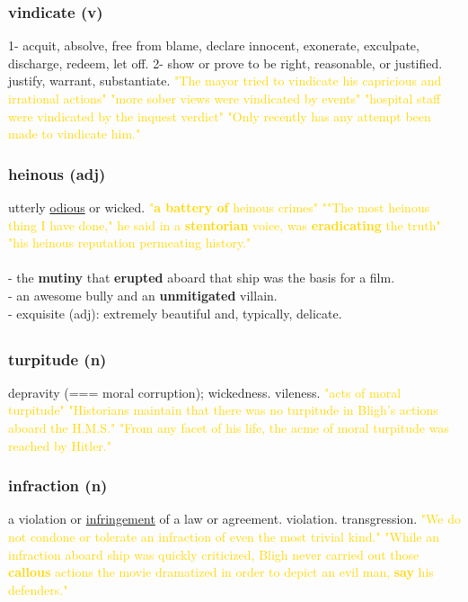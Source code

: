\documentclass{proc}
\begin{document}
	\subsubsection{\textcolor{brickred}{vindicate} (v)}
	1- acquit,
	absolve,
	free from blame,
	declare innocent,
	exonerate,
	exculpate,
	discharge,
	redeem,
	let off.
	2- show or prove to be right, reasonable, or justified.
	justify,
	warrant,
	substantiate.
	\textcolor{gold}{"The mayor tried to vindicate his capricious and irrational actions" "more sober views were vindicated by events" "hospital staff were vindicated by the inquest verdict" "Only recently has any attempt been made to vindicate him."}
	
	\subsubsection{\textcolor{brickred}{heinous} (adj)}
	utterly \underline{odious} or wicked.
	\textcolor{gold}{"\textbf{a battery of} heinous crimes" ""The most heinous thing I have done," he said in a \textbf{stentorian} voice, was \textbf{eradicating} the truth" "his heinous reputation permeating history."}\\\\
	- the \textbf{mutiny} that \textbf{erupted} aboard that ship was the basis for a film.\\
	- an awesome bully and an \textbf{unmitigated} villain.\\
	- exquisite (adj): extremely beautiful and, typically, delicate.
	
	\newpage
	\subsection{}
	\subsubsection{\textcolor{brickred}{turpitude} (n)}
	depravity (=== moral corruption); wickedness. vileness.
	\textcolor{gold}{"acts of moral turpitude" "Historians maintain that there was no turpitude in Bligh's actions aboard the H.M.S." "From any facet of his life, the acme of moral turpitude was reached by Hitler."}
	
	\subsubsection{\textcolor{brickred}{infraction} (n)}
	a violation or \underline{infringement} of a law or agreement. violation. transgression.
	\textcolor{gold}{"We do not condone or tolerate an infraction of even the most trivial kind." "While an infraction aboard ship was quickly 
		criticized, Bligh never carried out those \textbf{callous} actions the 
		movie dramatized in order to depict an evil man, \textbf{say} his 
		defenders."}
	
\end{document}
